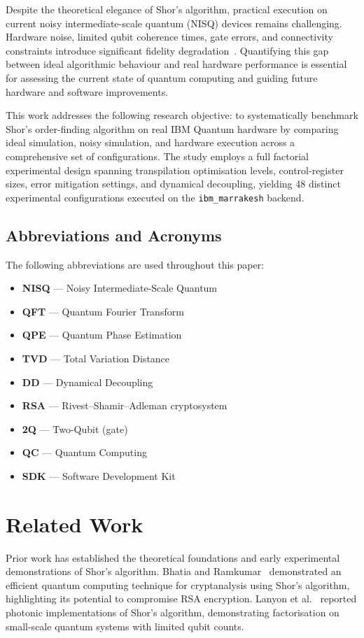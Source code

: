 \documentclass[conference]{IEEEtran}
\begin{document}
Despite the theoretical elegance of Shor's algorithm, practical execution on current noisy intermediate-scale quantum (NISQ) devices remains challenging. Hardware noise, limited qubit coherence times, gate errors, and connectivity constraints introduce significant fidelity degradation~\cite{b3}. Quantifying this gap between ideal algorithmic behaviour and real hardware performance is essential for assessing the current state of quantum computing and guiding future hardware and software improvements.

This work addresses the following research objective: to systematically benchmark Shor's order-finding algorithm on real IBM Quantum hardware by comparing ideal simulation, noisy simulation, and hardware execution across a comprehensive set of configurations. The study employs a full factorial experimental design spanning transpilation optimisation levels, control-register sizes, error mitigation settings, and dynamical decoupling, yielding 48 distinct experimental configurations executed on the \texttt{ibm\_marrakesh} backend.

\subsection{Abbreviations and Acronyms}
The following abbreviations are used throughout this paper:
\begin{itemize}
\item \textbf{NISQ} --- Noisy Intermediate-Scale Quantum
\item \textbf{QFT} --- Quantum Fourier Transform
\item \textbf{QPE} --- Quantum Phase Estimation
\item \textbf{TVD} --- Total Variation Distance
\item \textbf{DD} --- Dynamical Decoupling
\item \textbf{RSA} --- Rivest--Shamir--Adleman cryptosystem
\item \textbf{2Q} --- Two-Qubit (gate)
\item \textbf{QC} --- Quantum Computing
\item \textbf{SDK} --- Software Development Kit
\end{itemize}

\section{Related Work}

Prior work has established the theoretical foundations and early experimental demonstrations of Shor's algorithm. Bhatia and Ramkumar~\cite{b1} demonstrated an efficient quantum computing technique for cryptanalysis using Shor's algorithm, highlighting its potential to compromise RSA encryption. Lanyon et al.~\cite{b4} reported photonic implementations of Shor's algorithm, demonstrating factorisation on small-scale quantum systems with limited qubit counts.
\end{document}
